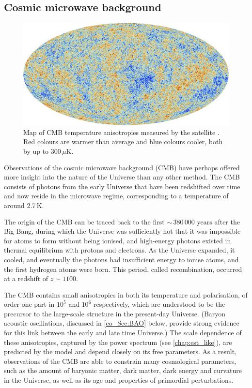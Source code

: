 \subsection{Cosmic microwave background}
\label{co_Sec:CMB}

\begin{figure}
\includegraphics[width=\textwidth]{planck_t}
\caption{Map of CMB temperature anisotropies measured by the \Planck{} satellite \citep{Planck2018I}. Red colours are warmer than average and blue colours cooler, both by up to $300\,\mu\text{K}$.}
\label{co_Fig:planck_t}
\end{figure}

Observations of the cosmic microwave background (CMB) have perhaps offered more insight into the nature of the Universe than any other method. The CMB consists of photons from the early Universe that have been redshifted over time and now reside in the microwave regime, corresponding to a temperature of around 2.7\,K.

The origin of the CMB can be traced back to the first $\sim$\,380\,000 years after the Big Bang, during which the Universe was sufficiently hot that it was impossible for atoms to form without being ionised, and high-energy photons existed in thermal equilibrium with protons and electrons. As the Universe expanded, it cooled, and eventually the photons had insufficient energy to ionise atoms, and the first hydrogen atoms were born. This period, called recombination, occurred at a redshift of $z \sim 1100$.

The CMB contains small anisotropies in both its temperature and polarisation, of order one part in $10^5$ and $10^6$ respectively, which are understood to be the precursor to the large-scale structure in the present-day Universe. (Baryon acoustic oscillations, discussed in \autoref{co_Sec:BAO} below, provide strong evidence for this link between the early and late time Universe.) The scale dependence of these anisotropies, captured by the power spectrum (see \autoref{chap:est_like}), are predicted by the \lcdm{} model and depend closely on its free parameters. As a result, observations of the CMB are able to constrain many cosmological parameters, such as the amount of baryonic matter, dark matter, dark energy and curvature in the Universe, as well as its age and properties of primordial perturbations.


